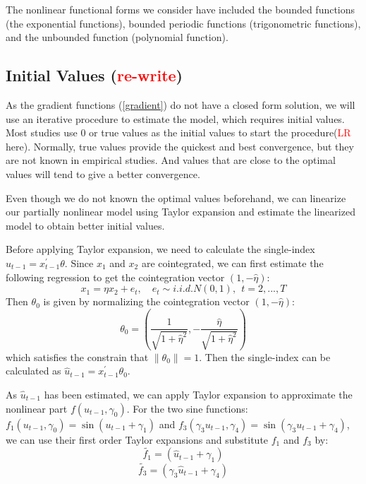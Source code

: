 \documentclass[a4paper,12pt,times,numbered,print,index]{report}
\numberwithin{equation}{section}
\begin{document}
The nonlinear functional forms we consider have included the bounded functions (the exponential functions), bounded periodic functions (trigonometric functions), and the unbounded function (polynomial function). 

\subsection{Initial Values (\textcolor{red}{re-write})}

As the gradient functions (\ref{gradient}) do not have a closed form solution, we will use an iterative procedure to estimate the model, which requires initial values. Most studies use 0 or true values as the initial values to start the procedure(\textcolor{red}{LR} here). Normally, true values provide the quickest and best convergence, but they are not known in empirical studies. And values that are close to the optimal values will tend to give a better convergence. 

Even though we do not known the optimal values beforehand, we can linearize our partially nonlinear model using Taylor expansion and estimate the linearized model to obtain better initial values. 


Before applying Taylor expansion, we need to calculate the single-index $u_{t-1} = x^{\prime}_{t-1}\theta$. Since $x_1$ and $x_2$ are cointegrated, we can first estimate the following regression to get the cointegration vector $(1,-\hat{\eta})$:
$$
x_1 =\eta x_2 + e_t, \quad e_{t}\sim i.i.d.N\left( 0,1\right) ,\ \ t=2,...,T
$$
Then $\theta_0$ is given by normalizing the cointegration vector $(1,-\hat{\eta})$:
$$
\theta_{0} = (\dfrac{1}{\sqrt{1+\hat{\eta}^2}}, -\dfrac{\hat{\eta}}{\sqrt{1+\hat{\eta}^2}})
$$
which satisfies the constrain that $\|\theta_0\| = 1$. Then the single-index can be calculated as $\hat{u}_{t-1} = x^{\prime}_{t-1}\theta_0$.


As $\hat{u}_{t-1}$ has been estimated, we can apply Taylor expansion to approximate the nonlinear part $f\left( \hat{u}_{t-1},\gamma _{0}\right)$. For the two sine functions: $f_{1}\left( u_{t-1},\gamma _{0}\right) =\sin \left( u_{t-1}+\gamma_{1}\right)$ and $f_{3}\left( \gamma_{3}u_{t-1},\gamma _{4}\right) =\sin \left( \gamma_{3}u_{t-1}+\gamma_{4}\right)$, we can use their first order Taylor expansions and substitute $f_1$ and $f_3$ by: 
$$
\tilde{f_1} = \left( \hat{u}_{t-1}+\gamma_{1}\right) 
$$ 
$$
\tilde{f_3} = \left( \gamma_{3}\hat{u}_{t-1}+\gamma_{4}\right) 
$$ 
\end{document}
